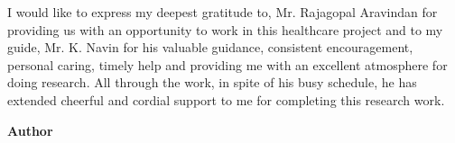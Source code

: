 \documentclass[BTech]{srmuthesis}
\begin{document}
\pagebreak
\acknowledgements
I would like to express my deepest gratitude to, Mr. Rajagopal Aravindan for providing us with an opportunity to work in this healthcare project and to my guide, Mr. K. Navin for his valuable guidance, consistent encouragement, personal caring, timely help and providing me with an excellent atmosphere for doing research. All through the work, in spite of his busy schedule, he has extended cheerful and cordial support to me for completing this research work. 

\begin{flushright}
{\bf Author}
\end{flushright}

\begin{singlespace}
\tableofcontents
\thispagestyle{empty}

\listoftables
{}
\listoffigures
{}
\end{singlespace}
\end{document}
